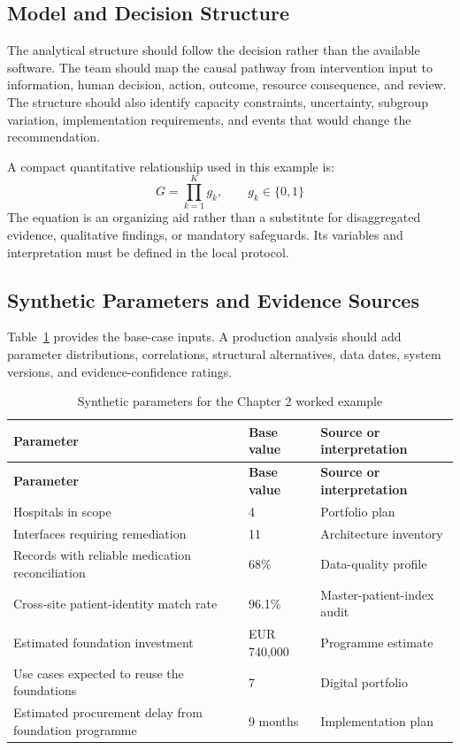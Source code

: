 \subsection{Model and Decision Structure}
The analytical structure should follow the decision rather than the available
software. The team should map the causal pathway from intervention input to
information, human decision, action, outcome, resource consequence, and review.
The structure should also identify capacity constraints, uncertainty, subgroup
variation, implementation requirements, and events that would change the
recommendation.

A compact quantitative relationship used in this example is:
\begin{equation}
G=\prod_{k=1}^{K}g_k,\qquad g_k\in\{0,1\}
\label{eq:comp-ch02-key-relationship}
\end{equation}
The equation is an organizing aid rather than a substitute for disaggregated evidence,
qualitative findings, or mandatory safeguards. Its variables and interpretation must
be defined in the local protocol.

\subsection{Synthetic Parameters and Evidence Sources}
Table~\ref{tab:comp-ch02-parameters} provides the base-case inputs. A
production analysis should add parameter distributions, correlations, structural
alternatives, data dates, system versions, and evidence-confidence ratings.

\begin{longtable}{@{}p{}p{}p{}@{}}
\caption{Synthetic parameters for the Chapter 2 worked example}
\label{tab:comp-ch02-parameters}\\
\toprule
\textbf{Parameter} & \textbf{Base value} & \textbf{Source or interpretation} \\
\midrule
\endfirsthead
\toprule
\textbf{Parameter} & \textbf{Base value} & \textbf{Source or interpretation} \\
\midrule
\endhead
\bottomrule
\endlastfoot
Hospitals in scope & 4 & Portfolio plan \\
Interfaces requiring remediation & 11 & Architecture inventory \\
Records with reliable medication reconciliation & 68\% & Data-quality profile \\
Cross-site patient-identity match rate & 96.1\% & Master-patient-index audit \\
Estimated foundation investment & EUR 740,000 & Programme estimate \\
Use cases expected to reuse the foundations & 7 & Digital portfolio \\
Estimated procurement delay from foundation programme & 9 months & Implementation plan \\
\end{longtable}

